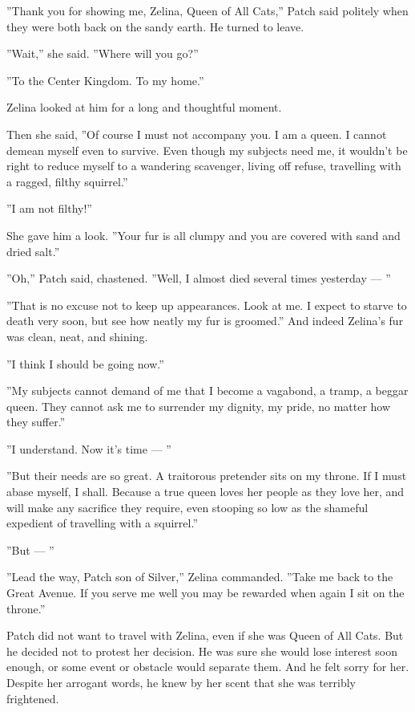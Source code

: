 \documentclass[12pt]{book}
\begin{document}
''Thank you for showing me, Zelina, Queen of All Cats,'' Patch said politely when they were both back on the sandy earth. He turned to leave.

''Wait,'' she said. ''Where will you go?''

''To the Center Kingdom. To my home.''

Zelina looked at him for a long and thoughtful moment.

Then she said, ''Of course I must not accompany you. I am a queen. I cannot demean myself even to survive. Even though my subjects need me, it wouldn't be right to reduce myself to a wandering scavenger, living off refuse, travelling with a ragged, filthy squirrel.''

''I am not filthy!''

She gave him a look. ''Your fur is all clumpy and you are covered with sand and dried salt.''

''Oh,'' Patch said, chastened. ''Well, I almost died several times yesterday ---
''

''That is no excuse not to keep up appearances. Look at me. I expect to starve to death very soon, but see how neatly my fur is groomed.'' And indeed Zelina's fur was clean, neat, and shining.

''I think I should be going now.''

''My subjects cannot demand of me that I become a vagabond, a tramp, a beggar queen. They cannot ask me to surrender my dignity, my pride, no matter how they suffer.''

''I understand. Now it's time ---
''

''But their needs are so great. A traitorous pretender sits on my throne. If I must abase myself, I shall. Because a true queen loves her people as they love her, and will make any sacrifice they require, even stooping so low as the shameful expedient of travelling with a squirrel.''

''But ---
''

''Lead the way, Patch son of Silver,'' Zelina commanded. ''Take me back to the Great Avenue. If you serve me well you may be rewarded when again I sit on the throne.''

Patch did not want to travel with Zelina, even if she was Queen of All Cats. But he decided not to protest her decision. He was sure she would lose interest soon enough, or some event or obstacle would separate them. And he felt sorry for her. Despite her arrogant words, he knew by her scent that she was terribly frightened.
\end{document}
